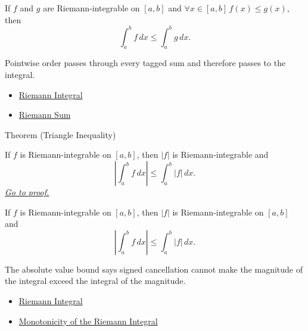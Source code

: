 \begin{remark*}
If \(f\) and \(g\) are Riemann-integrable on \([a,b]\) and
\(\forall x\in[a,b]\, f(x)\le g(x)\), then
\[
  \int_a^b f\,dx\le \int_a^b g\,dx .
\]
\end{remark*}

\begin{remark*}[Interpretation]
Pointwise order passes through every tagged sum and therefore passes to the
integral.
\end{remark*}

\begin{dependencies}
\begin{itemize}
  \item \hyperref[def:riemann-integral]{Riemann Integral}
  \item \hyperref[def:riemann-sum]{Riemann Sum}
\end{itemize}
\end{dependencies}

\begin{theorembox}{Theorem (Triangle Inequality)}
\begin{theorem}
\label{thm:riemann-integral-triangle-inequality}
If \(f\) is Riemann-integrable on \([a,b]\), then \(|f|\) is
Riemann-integrable and
\[
  \left|\int_a^b f\,dx\right|\le \int_a^b |f|\,dx .
\]
\hyperref[prf:riemann-integral-triangle-inequality]{\textit{Go to proof.}}
\end{theorem}
\end{theorembox}

\begin{remark*}
If \(f\) is Riemann-integrable on \([a,b]\), then \(|f|\) is
Riemann-integrable on \([a,b]\) and
\[
  \left|\int_a^b f\,dx\right|\le \int_a^b |f|\,dx .
\]
\end{remark*}

\begin{remark*}[Interpretation]
The absolute value bound says signed cancellation cannot make the magnitude of
the integral exceed the integral of the magnitude.
\end{remark*}

\begin{dependencies}
\begin{itemize}
  \item \hyperref[def:riemann-integral]{Riemann Integral}
  \item \hyperref[thm:riemann-integral-monotonicity]{Monotonicity of the Riemann Integral}
\end{itemize}
\end{dependencies}

